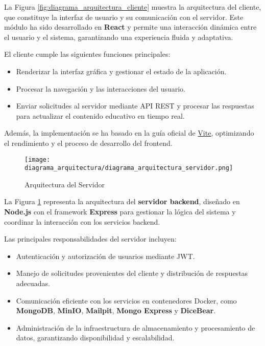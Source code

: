 La Figura \ref{fig:diagrama_arquitectura_cliente} muestra la arquitectura del
cliente, que constituye la interfaz de usuario y su comunicación con el
servidor. Este módulo ha sido desarrollado en \textbf{React} y permite una
interacción dinámica entre el usuario y el sistema, garantizando una experiencia
fluida y adaptativa.

El cliente cumple las siguientes funciones principales:
\begin{itemize}
    \item Renderizar la interfaz gráfica y gestionar el estado de la aplicación.
    \item Procesar la navegación y las interacciones del usuario.
    \item Enviar solicitudes al servidor mediante API REST y procesar las
    respuestas para actualizar el contenido educativo en tiempo real.
\end{itemize}

Además, la implementación se ha basado en la guía oficial de
\href{https://vite.dev/guide/}{Vite}, optimizando el rendimiento y el proceso de
desarrollo del frontend.

\begin{figure}[H]
    \centering
    \texttt{[image: diagrama\_arquitectura/diagrama\_arquitectura\_servidor.png]}
    \caption{Arquitectura del Servidor}
    \label{fig:diagrama_arquitectura_servidor}
\end{figure}

La Figura \ref{fig:diagrama_arquitectura_servidor} representa la arquitectura
del \textbf{servidor backend}, diseñado en \textbf{Node.js} con el framework
\textbf{Express} para gestionar la lógica del sistema y coordinar la interacción
con los servicios backend.

Las principales responsabilidades del servidor incluyen:
\begin{itemize}
    \item Autenticación y autorización de usuarios mediante JWT.
    \item Manejo de solicitudes provenientes del cliente y distribución de
    respuestas adecuadas.
    \item Comunicación eficiente con los servicios en contenedores Docker, como
    \textbf{MongoDB}, \textbf{MinIO}, \textbf{Mailpit}, \textbf{Mongo Express} y
    \textbf{DiceBear}.
    \item Administración de la infraestructura de almacenamiento y procesamiento
    de datos, garantizando disponibilidad y escalabilidad.
\end{itemize}


